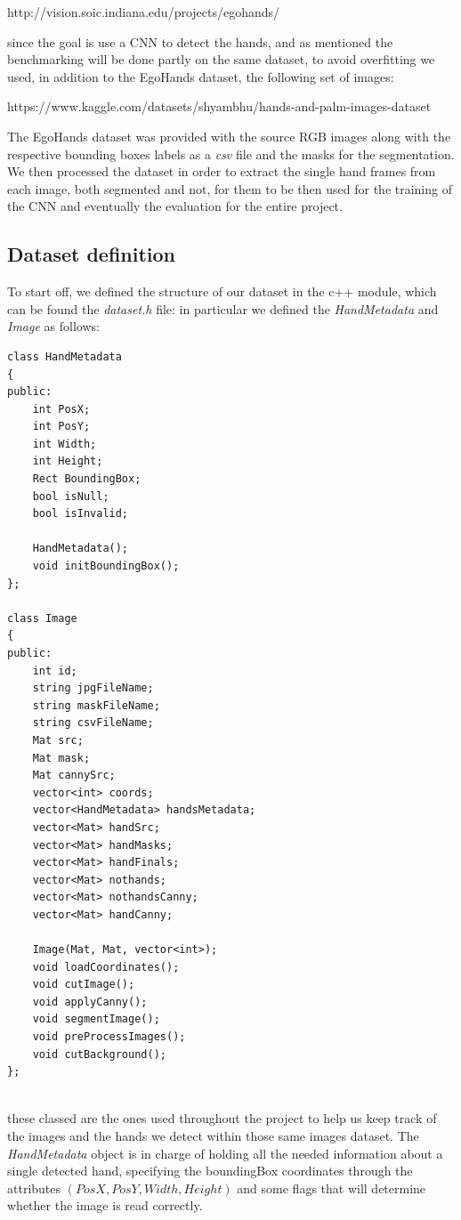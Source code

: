 http://vision.soic.indiana.edu/projects/egohands/

since the goal is use a CNN to detect the hands, and as mentioned the
benchmarking will be done partly on the same dataset, to avoid overfitting we
used, in addition to the EgoHands dataset,
the following set of images:

https://www.kaggle.com/datasets/shyambhu/hands-and-palm-images-dataset

The EgoHands dataset was provided with the source RGB images along with the
respective bounding boxes labels as a \textit{csv} file and the masks for the
segmentation. We then processed
the dataset in order to extract the single hand frames from each image, both
segmented and not, for them to be then used for the training of the CNN and
eventually the evaluation for the entire
project.

\subsection{Dataset definition}

To start off, we defined the structure of our dataset in the c++ module, which
can be found the \textit{dataset.h} file: in particular we defined the
\textit{HandMetadata} and \textit{Image}
as follows:

\begin{lstlisting}[]
    class HandMetadata
{
public:
    int PosX;
    int PosY;
    int Width;
    int Height;
    Rect BoundingBox;
    bool isNull;
    bool isInvalid;

    HandMetadata();
    void initBoundingBox();
};

class Image
{
public:
    int id;
    string jpgFileName;
    string maskFileName;
    string csvFileName;
    Mat src;
    Mat mask;
    Mat cannySrc;
    vector<int> coords;
    vector<HandMetadata> handsMetadata;
    vector<Mat> handSrc;
    vector<Mat> handMasks;
    vector<Mat> handFinals;
    vector<Mat> nothands;
    vector<Mat> nothandsCanny;
    vector<Mat> handCanny;

    Image(Mat, Mat, vector<int>);
    void loadCoordinates();
    void cutImage();
    void applyCanny();
    void segmentImage();
    void preProcessImages();
    void cutBackground();
};


\end{lstlisting}

these classed are the ones used throughout the project to help us keep track of
the images and the hands we detect within those same images dataset.
The \textit{HandMetadata} object is in charge of holding all the needed
information about a single detected hand, specifying the boundingBox
coordinates
through the attributes $(PosX, PosY, Width, Height)$ and some flags that will
determine whether the image is read correctly.

